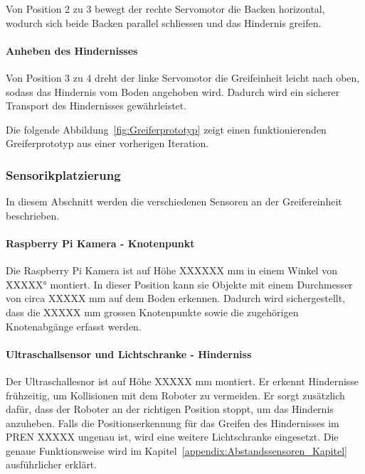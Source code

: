 \documentclass[main.tex]{subfiles} %
\begin{document}
Von Position 2 zu 3 bewegt der rechte Servomotor die Backen horizontal, wodurch sich beide Backen parallel schliessen und das Hindernis greifen.

\paragraph{Anheben des Hindernisses} 

Von Position 3 zu 4 dreht der linke Servomotor die Greifeinheit leicht nach oben, sodass das Hindernis vom Boden angehoben wird. 
Dadurch wird ein sicherer Transport des Hindernisses gewährleistet.



\newpage

Die folgende Abbildung~\ref{fig:Greiferprototyp} zeigt einen funktionierenden Greiferprototyp 
aus einer vorherigen Iteration.


\subsubsection*{Sensorikplatzierung}

In diesem Abschnitt werden die verschiedenen Sensoren an der Greifereinheit beschrieben.

\paragraph{Raspberry Pi Kamera - Knotenpunkt}
Die Raspberry Pi Kamera ist auf Höhe XXXXXX mm in einem Winkel von XXXXX° montiert.
In dieser Position kann sie Objekte mit einem Durchmesser von circa XXXXX mm auf dem Boden erkennen.
Dadurch wird sichergestellt, dass die XXXXX mm grossen Knotenpunkte sowie die zugehörigen
Knotenabgänge erfasst werden.


\paragraph{Ultraschallsensor und Lichtschranke - Hinderniss}
Der Ultraschallesnor ist auf Höhe XXXXX mm montiert. Er erkennt Hindernisse frühzeitig,
um Kollisionen mit dem Roboter zu vermeiden. Er sorgt zusätzlich dafür, dass der Roboter an der richtigen 
Position stoppt, um das Hindernis anzuheben. Falls die Positionserkennung für das Greifen 
des Hindernisses im PREN XXXXX ungenau ist, wird eine weitere Lichtschranke eingesetzt.
Die genaue Funktionsweise wird im Kapitel~\ref{appendix:Abstandssensoren_Kapitel} ausführlicher erklärt.
\end{document}
